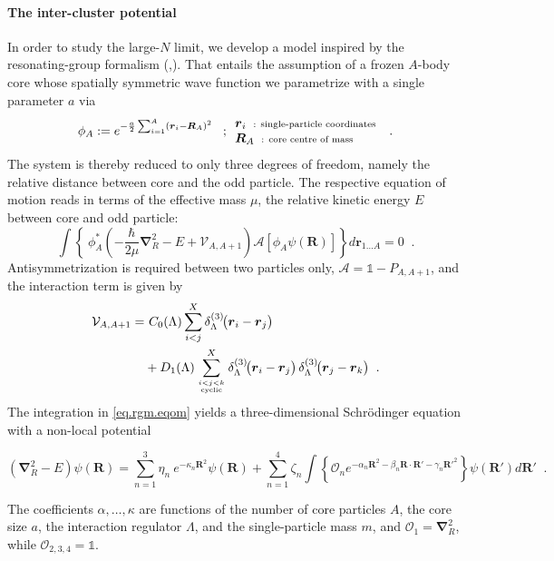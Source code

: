 \documentclass[aps,nofootinbib,prl,showpacs,twocolumn,groupedaddress,superscriptaddress]
{revtex4}
\newcommand{\be}{\begin{equation}}
\newcommand{\ee}{\end{equation}}
\newcommand{\ve}[1]{\ensuremath{\boldsymbol{#1}}}
\newcommand{\ddrei}[1]{\delta_{\tiny \Lambda}^{(3)}\!\big(#1\big)}
\begin{document}
\paragraph{The inter-cluster potential}
In order to study the large-$N$ limit, we develop a model inspired by the resonating-group formalism
(\cite{Wheeler:1937zz},\cite{Wildermuth1977s}).
That entails the assumption of a frozen $A$-body core whose spatially symmetric wave function we
parametrize with a single parameter $a$ via
\be\label{eq.rgm.corewfkt}
\phi_A:=e^{-\frac{a}{2}\sum_{i=1}^A\left(\ve{r}_i-\ve{R}_A\right)^2}\;\;\;;
\begin{array}{l}
     \ve{r}_i\;\;\text{\scriptsize : single-particle coordinates}  \\
     \ve{R}_A\;\;\text{\scriptsize : core centre of mass}
\end{array}\;\;.
\ee
The system is thereby reduced to only three degrees of freedom, namely the relative distance
between core and the odd particle. The respective equation of motion reads in terms of the effective
mass $\mu$, the relative kinetic energy $E$ between core and odd particle:
\be\label{eq.rgm.eqom}
\int\left\lbrace~\phi^*_A\left(-\frac{\hbar}{2\mu}\ve{\nabla}_R^2-E+\mathcal{V}_{A,A+1}\right)
\mathcal{A}\left[\phi_A\psi(\ve{R})\right]\right\rbrace d\ve{r}_{1\ldots A}=0\;\;.
\ee
Antisymmetrization is required between two particles only, $\mathcal{A}=\mathbb{1}-P_{A,A+1}$, and the
interaction term is given by
\begin{align}
\mathcal{V}_{A,A+1}=&~C_0(\Lambda)\sum_{i<j}^X\ddrei{\ve{r}_i-\ve{r}_j}\\
&+D_1(\Lambda)\sum^X_{i<j<k\atop\text{\tiny cyclic}}\ddrei{\ve{r}_i-\ve{r}_j}\,
\ddrei{\ve{r}_j-\ve{r}_k}\;\;.\nonumber
\end{align}
The integration in \eqref{eq.rgm.eqom} yields a three-dimensional Schr\"odinger equation with a
non-local potential
\begin{widetext}
\be\label{eq.rgm.sglnonloc}
\left(\ve{\nabla}_R^2-E\right)\psi(\ve{R})=\sum_{n=1}^3\eta_n~e^{-\kappa_n\ve{R}^2}\psi(\ve{R})+
\sum_{n=1}^4\zeta_n\int\left\lbrace\mathcal{O}_ne^{-\alpha_n\ve{R}^2-\beta_n\ve{R}\cdot\ve{R}'
-\gamma_n\ve{R}'^2}\right\rbrace\psi(\ve{R}') d\ve{R}'\;\;.
\ee
\end{widetext}
The coefficients $\alpha,\ldots,\kappa$ are functions of the number of core particles $A$,
the core size $a$, the interaction regulator $\Lambda$, and the single-particle mass $m$,
and $\mathcal{O}_1=\ve{\nabla}_R^2$, while $\mathcal{O}_{2,3,4}=\mathbb{1}$.
\end{document}
